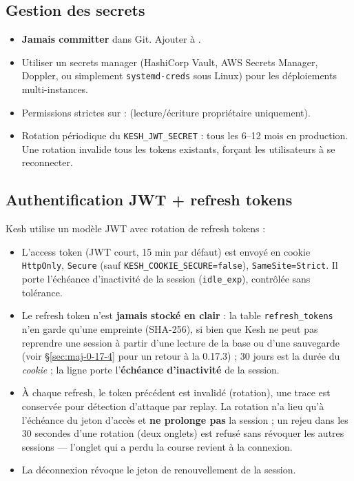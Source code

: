 \documentclass[a4paper,11pt,oneside]{article}
\begin{document}
\subsection{Gestion des secrets}

\begin{itemize}
    \item \textbf{Jamais committer } dans Git. Ajouter à .
    \item Utiliser un secrets manager (HashiCorp Vault, AWS Secrets Manager, Doppler, ou simplement \texttt{systemd-creds} sous Linux) pour les déploiements multi-instances.
    \item Permissions strictes sur  :  (lecture/écriture propriétaire uniquement).
    \item Rotation périodique du \texttt{KESH\_JWT\_SECRET} : tous les 6--12 mois en production. Une rotation invalide tous les tokens existants, forçant les utilisateurs à se reconnecter.
\end{itemize}

\subsection{Authentification JWT + refresh tokens}\label{sec:auth-jwt}

Kesh utilise un modèle JWT avec rotation de refresh tokens :

\begin{itemize}
    \item L'access token (JWT court, 15 min par défaut) est envoyé en cookie \texttt{HttpOnly}, \texttt{Secure} (sauf \texttt{KESH\_COOKIE\_SECURE=false}), \texttt{SameSite=Strict}. Il porte l'échéance d'inactivité de la session (\texttt{idle\_exp}), contrôlée sans tolérance.
    \item Le refresh token n'est \textbf{jamais stocké en clair} : la table \texttt{refresh\_tokens} n'en garde qu'une empreinte (SHA-256), si bien que Kesh ne peut pas reprendre une session à partir d'une lecture de la base ou d'une sauvegarde (voir \S\ref{sec:maj-0-17-4} pour un retour à la 0.17.3) ; 30 jours est la durée du \emph{cookie} ; la ligne porte l'\textbf{échéance d'inactivité} de la session.
    \item À chaque refresh, le token précédent est invalidé (rotation), une trace est conservée pour détection d'attaque par replay. La rotation n'a lieu qu'à l'échéance du jeton d'accès et \textbf{ne prolonge pas} la session ; un rejeu dans les 30 secondes d'une rotation (deux onglets) est refusé sans révoquer les autres sessions --- l'onglet qui a perdu la course revient à la connexion.
    \item La déconnexion révoque le jeton de renouvellement de la session.
\end{itemize}
\end{document}

